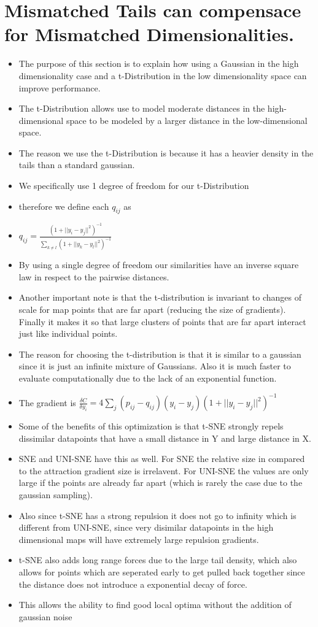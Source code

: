 \documentclass[11pt]{article}
\begin{document}
\section{Mismatched Tails can compensace for Mismatched Dimensionalities.}
\label{sec:org1f1e4b9}
\begin{itemize}
\item The purpose of this section is to explain how using a Gaussian in the high dimensionality case and a t-Distribution in the low dimensionality space can improve performance.
\item The t-Distribution allows use to model moderate distances in the high-dimensional space to be modeled by a larger distance in the low-dimensional space.
\item The reason we use the t-Distribution is because it has a heavier density in the tails than a standard gaussian.
\item We specifically use 1 degree of freedom for our t-Distribution
\item therefore we define each \(q_{ij}\) as
\item \(q_{ij} = \frac{(1+||y_i-y_j||^2)^{-1}}{\sum_{k \neq l}(1+||y_k - y_l||^2)^{-1}}\)
\item By using a single degree of freedom our similarities have an inverse square law in respect to the pairwise distances.
\item Another important note is that the t-distribution is invariant to changes of scale for map points that are far apart (reducing the size of gradients). Finally it makes it so that large clusters of points that are far apart interact just like individual points.
\item The reason for choosing the t-distribution is that it is similar to a gaussian since it is just an infinite mixture of Gaussians. Also it is much faster to evaluate computationally due to the lack of an exponential function.
\item The gradient is \(\frac{\delta C}{\delta y_i} = 4 \sum_j (p_{ij}-q_{ij}) (y_i-y_j) (1+||y_i-y_j||^2)^{-1}\)
\item Some of the benefits of this optimization is that t-SNE strongly repels dissimilar datapoints that have a small distance in Y and large distance in X.
\item SNE and UNI-SNE have this as well. For SNE the relative size in compared to the attraction gradient size is irrelavent. For UNI-SNE the values are only large if the points are already far apart (which is rarely the case due to the gaussian sampling).
\item Also since t-SNE has a strong repulsion it does not go to infinity which is different from UNI-SNE, since very disimilar datapoints in the high dimensional maps will have extremely large repulsion gradients.
\item t-SNE also adds long range forces due to the large tail density, which also allows for points which are seperated early to get pulled back together since the distance does not introduce a exponential decay of force.
\item This allows the ability to find good local optima without the addition of gaussian noise
\end{itemize}
\end{document}
